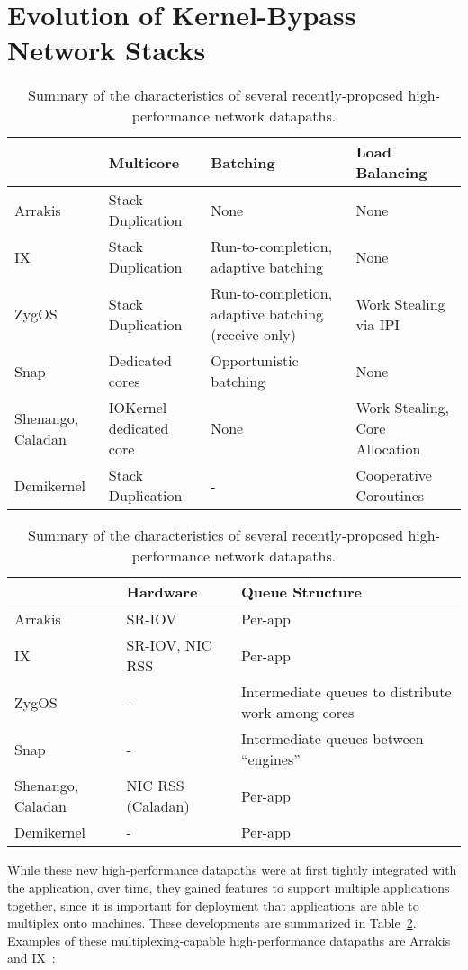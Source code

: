 \section{Evolution of Kernel-Bypass Network Stacks}
\begin{table}
    \small
    \begin{tabular}{p{2cm} p{3cm} p{3.5cm} p{3cm}}
        \hline
                         & Multicore & Batching & Load Balancing \\
        \hline
        Arrakis          & Stack Duplication & None & None \\
        IX               & Stack Duplication & Run-to-completion, adaptive batching & None \\
        ZygOS            & Stack Duplication & Run-to-completion, adaptive batching (receive only) & Work Stealing via IPI \\
        Snap             & Dedicated cores & Opportunistic batching & None \\
        Shenango, Caladan& IOKernel dedicated core & None & Work Stealing, Core Allocation \\
        Demikernel       & Stack Duplication & - & Cooperative Coroutines \\
        \hline
    \end{tabular}
    \begin{tabular}{p{2cm} p{3cm} p{6.5cm}}
        \hline
                         & Hardware & Queue Structure \\
        \hline
        Arrakis          & SR-IOV & Per-app \\
        IX               & SR-IOV, NIC RSS & Per-app \\
        ZygOS            & - & Intermediate queues to distribute work among cores \\
        Snap             & - & Intermediate queues between ``engines'' \\
        Shenango, Caladan& NIC RSS (Caladan) & Per-app \\
        Demikernel       & - & Per-app \\
        \hline
    \end{tabular}
    \caption{Summary of the characteristics of several recently-proposed high-performance network datapaths. }
    \label{t:systems}
\end{table}
While these new high-performance datapaths were at first tightly integrated with the application, over time, they gained features to support multiple applications together, since it is important for deployment that applications are able to multiplex onto machines. These developments are summarized in Table~\ref{t:systems}. Examples of these multiplexing-capable high-performance datapaths are Arrakis~\cite{arrakis} and IX~\cite{ix}:
